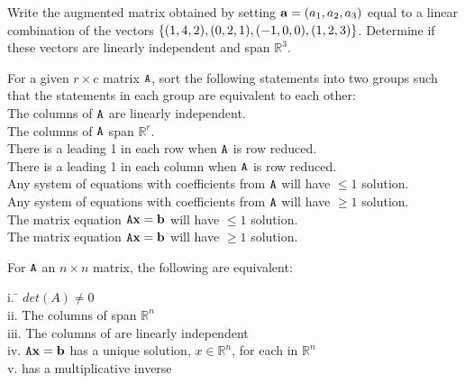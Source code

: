  
\begin{myexb}[\bd{b}]
	Write the augmented matrix obtained by setting $\mathbf{a} = ({a_1},{a_2},{a_3})$  equal to a linear combination of the vectors $\{  ({1},{4},{2}), ({0},{2},{1}), ({-1},{0},{0}), ({1},{2},{3}) \}$. Determine if these vectors are linearly independent and span $\mathbb{R}^3$.
\end{myexb}

\begin{myexc}[\bd{c}]
	For a given $r \times c$ matrix $\texttt{A}$, sort the following statements into two groups such that the statements in each group are equivalent to each other:\\ 
		 \indent The columns of $\texttt{A}$ are linearly independent.\\
		 \indent The columns of $\texttt{A}$ span $\mathbb{R}^r$. \\
		 \indent There is a leading 1 in each row when $\texttt{A}$ is row reduced.\\
		 \indent There is a leading 1 in each column when $\texttt{A}$ is row reduced. \\
		 \indent Any system of equations with coefficients from $\texttt{A}$ will have $\leq 1$ solution.\\
		 \indent Any system of equations with coefficients from $\texttt{A}$ will have $\geq 1$ solution.\\
		 \indent The matrix equation $\texttt{A}\mathbf{x}=\mathbf{b}$ will have $\leq 1$ solution. \\
		 \indent The matrix equation $\texttt{A}\mathbf{x}=\mathbf{b}$ will have $\geq 1$ solution.\\  
\end{myexc}

\begin{theorem}
	For $\texttt{A}$ an $n \times n$ matrix, the following are equivalent: 
	\begin{tabbing}
	\indent i. \quad \= $det(A) \neq 0$\\
	\indent ii. \> The columns of  span $\mathbb{R}^n$ \\
	\indent iii. \> The columns of  are linearly independent \\
	\indent iv. \> $\texttt{A}\mathbf{x}=\mathbf{b}$ has a unique solution, $x \in \mathbb{R}^n$, for each  in $\mathbb{R}^n$ \\
	\indent v. \>  has a multiplicative inverse
    \end{tabbing}
\end{theorem}
\vspace{-.3in}\hspace{5in}\begin{annotation}
\end{annotation}

